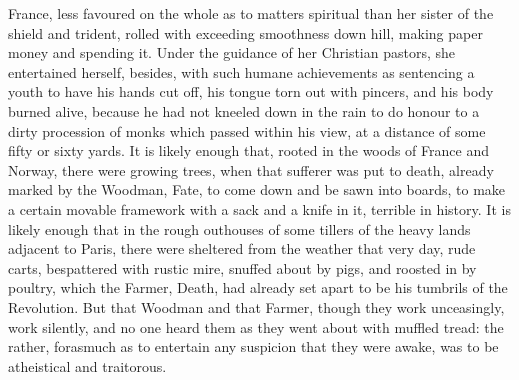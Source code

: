 France, less favoured on the whole as to matters spiritual than
her sister of the shield and trident, rolled with exceeding
smoothness down hill, making paper money and spending it.
Under the guidance of her Christian pastors, she entertained
herself, besides, with such humane achievements as sentencing
a youth to have his hands cut off, his tongue torn out with
pincers, and his body burned alive, because he had not kneeled
down in the rain to do honour to a dirty procession of monks
which passed within his view, at a distance of some fifty or
sixty yards.  It is likely enough that, rooted in the woods of
France and Norway, there were growing trees, when that sufferer
was put to death, already marked by the Woodman, Fate, to come
down and be sawn into boards, to make a certain movable framework
with a sack and a knife in it, terrible in history.  It is likely
enough that in the rough outhouses of some tillers of the heavy
lands adjacent to Paris, there were sheltered from the weather
that very day, rude carts, bespattered with rustic mire, snuffed
about by pigs, and roosted in by poultry, which the Farmer, Death,
had already set apart to be his tumbrils of the Revolution.
But that Woodman and that Farmer, though they work unceasingly,
work silently, and no one heard them as they went about with
muffled tread:  the rather, forasmuch as to entertain any suspicion
that they were awake, was to be atheistical and traitorous.

